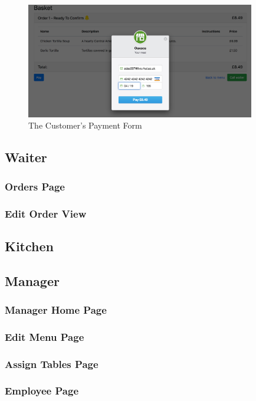 \documentclass[12pt, twoside, a4paper]{report}
\begin{document}
\begin{figure}[H]
  \centering
  \includegraphics[width=10cm]{Payment.png}
  \caption{The Customer's Payment Form}
  \label{fig:pay}
\end{figure}

\subsection*{Waiter}
\subsubsection*{Orders Page}

\subsubsection*{Edit Order View}

\subsection*{Kitchen}

\subsection*{Manager}
\subsubsection*{Manager Home Page}

\subsubsection*{Edit Menu Page}

\subsubsection*{Assign Tables Page}

\subsubsection*{Employee Page}
\end{document}
